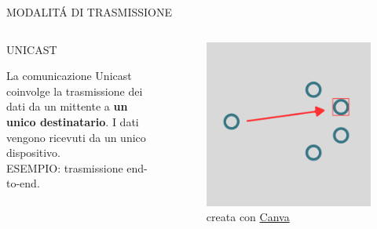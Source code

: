 \documentclass[aspectratio=1610,handout]{beamer}
\begin{document}
\begin{frame}{MODALIT\'A DI TRASMISSIONE}
    \begin{columns}
        \begin{alertblock}{UNICAST}
            \begin{minipage}{0.96\linewidth}
                \justifying
                La comunicazione Unicast coinvolge la trasmissione dei dati da un mittente a \textbf{un 
                unico destinatario}. I dati vengono ricevuti da un unico dispositivo.\\
                ESEMPIO: trasmissione end-to-end.
            \end{minipage}
        \end{alertblock}
           \begin{figure}
               \includegraphics[width=\linewidth]{img/unicast.png}
               \caption{{creata con \href{https://www.canva.com}{Canva}}}
           \end{figure}
    \end{columns}
\end{frame}
\end{document}
